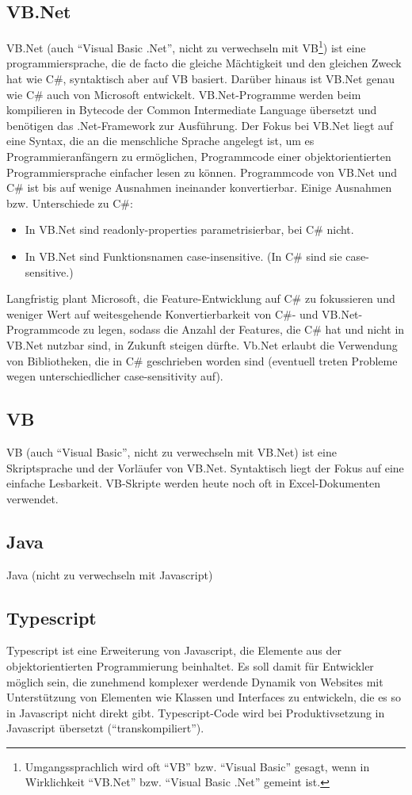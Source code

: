 \begin{multicols}{3}
\subsection{VB.Net}
VB.Net (auch \enquote{Visual Basic .Net}, nicht zu verwechseln mit VB\footnote{Umgangssprachlich wird oft \enquote{VB} bzw. \enquote{Visual Basic} gesagt, wenn in Wirklichkeit \enquote{VB.Net} bzw. \enquote{Visual Basic .Net} gemeint ist.}) ist eine programmiersprache, die de facto die gleiche Mächtigkeit und den gleichen Zweck hat wie C\#, syntaktisch aber auf VB basiert. Darüber hinaus ist VB.Net genau wie C\# auch von Microsoft entwickelt. VB.Net-Programme werden beim kompilieren in Bytecode der Common Intermediate Language übersetzt und benötigen das .Net-Framework zur Ausführung. Der Fokus bei VB.Net liegt auf eine Syntax, die an die menschliche Sprache angelegt ist, um es Programmieranfängern zu ermöglichen, Programmcode einer objektorientierten Programmiersprache einfacher lesen zu können. Programmcode von VB.Net und C\# ist bis auf wenige Ausnahmen ineinander konvertierbar. Einige Ausnahmen bzw. Unterschiede zu C\#:\\
\begin{itemize}
\item In VB.Net sind readonly-properties parametrisierbar, bei C\# nicht.
\item In VB.Net sind Funktionsnamen case-insensitive. (In C\# sind sie case-sensitive.)
\end{itemize}
Langfristig plant Microsoft, die Feature-Entwicklung auf C\# zu fokussieren und weniger Wert auf weitesgehende Konvertierbarkeit von C\#- und VB.Net-Programmcode zu legen, sodass die Anzahl der Features, die C\# hat und nicht in VB.Net nutzbar sind, in Zukunft steigen dürfte. Vb.Net erlaubt die Verwendung von Bibliotheken, die in C\# geschrieben worden sind (eventuell treten Probleme wegen unterschiedlicher case-sensitivity auf).
\subsection{VB}
VB (auch \enquote{Visual Basic}, nicht zu verwechseln mit VB.Net) ist eine Skriptsprache und der Vorläufer von VB.Net. Syntaktisch liegt der Fokus auf eine einfache Lesbarkeit. VB-Skripte werden heute noch oft in Excel-Dokumenten verwendet.
\subsection{Java}
Java (nicht zu verwechseln mit Javascript)
\subsection{Typescript}
Typescript ist eine Erweiterung von Javascript, die Elemente aus der objektorientierten Programmierung beinhaltet. Es soll damit für Entwickler möglich sein, die zunehmend komplexer werdende Dynamik von Websites mit Unterstützung von Elementen wie Klassen und Interfaces zu entwickeln, die es so in Javascript nicht direkt gibt. Typescript-Code wird bei Produktivsetzung in Javascript übersetzt (\enquote{transkompiliert}).

\end{multicols}
